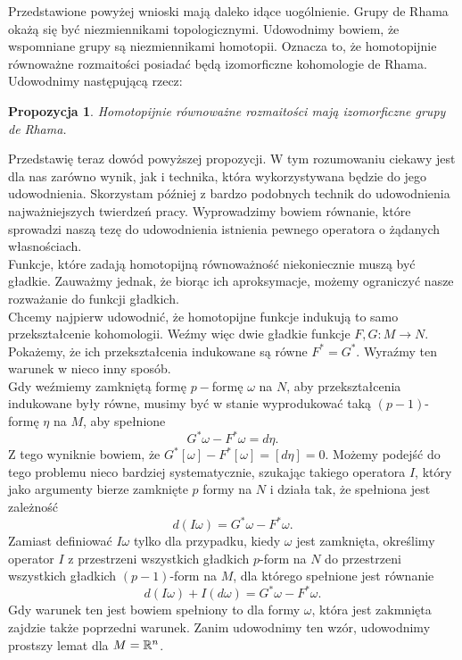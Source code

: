 \documentclass[licencjacka]{pracamgr}
\theoremstyle{definition}
\theoremstyle{definition}
\theoremstyle{plain}
\theoremstyle{plain}
\newtheorem{proposition}{Propozycja}[section]
\theoremstyle{plain}
\theoremstyle{plain}
\theoremstyle{plain}
\def\R{\ensuremath\mathbb{R}}
\begin{document}
Przedstawione powyżej wnioski mają daleko idące uogólnienie. Grupy de Rhama
okażą się być niezmiennikami topologicznymi.  Udowodnimy bowiem, że wspomniane
grupy są niezmiennikami homotopii.  Oznacza to, że homotopijnie równoważne
rozmaitości posiadać będą izomorficzne kohomologie de Rhama. Udowodnimy
następującą rzecz:

\begin{proposition}\label{homotopy-de-Rham}
    Homotopijnie równoważne rozmaitości mają izomorficzne grupy de Rhama.
\end{proposition}

Przedstawię teraz dowód powyższej propozycji.
  W tym rozumowaniu ciekawy jest
dla nas zarówno wynik, jak i technika, która wykorzystywana będzie do jego
udowodnienia.  Skorzystam później z bardzo podobnych technik do udowodnienia
najważniejszych twierdzeń pracy.  Wyprowadzimy bowiem równanie, które sprowadzi
naszą tezę do udowodnienia istnienia pewnego operatora o żądanych własnościach.  \\

Funkcje, które zadają homotopijną równoważność niekoniecznie muszą być gładkie.
Zauważmy jednak, że biorąc ich aproksymacje, możemy ograniczyć nasze rozważanie
do funkcji gładkich. \\

Chcemy najpierw udowodnić, że homotopijne funkcje indukują to samo
przekształcenie kohomologii.  Weźmy więc dwie gładkie funkcje $F, G: M
\rightarrow N$.  Pokażemy, że ich przekształcenia indukowane są równe $F^\ast =
G^\ast$. Wyraźmy ten warunek w nieco inny sposób. \\

Gdy weźmiemy zamkniętą formę $p-$formę $\omega$ na $N$, aby
przekształcenia indukowane były równe, musimy być w stanie
wyprodukować taką $(p-1)$-formę $\eta$ na $M$, aby spełnione
\[
    G^\ast \omega - F^\ast \omega = d\eta.
\]
Z tego wyniknie bowiem, że
$ G^\ast [\omega] - F^\ast [\omega] =
[d\eta] = 0$. 
Możemy podejść do tego problemu nieco bardziej systematycznie, 
szukając takiego operatora
$I$, który jako argumenty bierze zamknięte $p$ formy na $N$
i działa tak, że spełniona jest zależność
\[
    d(I\omega) = G^\ast \omega - F^\ast \omega.
\] 
Zamiast definiować $I \omega$ tylko dla przypadku, kiedy $\omega$
jest zamknięta, określimy operator
$I$ z przestrzeni wszystkich gładkich $p$-form na $N$
do przestrzeni wszystkich gładkich $(p-1)$-form na $M$,
dla którego spełnione jest równanie
\begin{equation}\label{homotopy-formula}
    d(I\omega) + I(d\omega) = G^\ast \omega - F^\ast \omega.
\end{equation}
Gdy warunek ten jest bowiem spełniony to dla formy $\omega$, która
jest zakmnięta zajdzie także poprzedni warunek.  Zanim udowodnimy
ten wzór, udowodnimy prostszy lemat dla $M = \R^n$. \\
\end{document}
